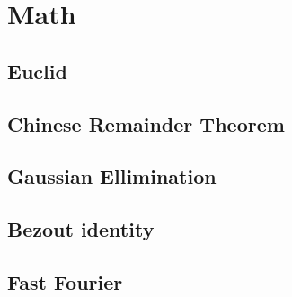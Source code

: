 \section{Math}

\subsection{Euclid}
 

\subsection{Chinese Remainder Theorem}
\subsection{Gaussian Ellimination}
\subsection{Bezout identity}
\subsection{Fast Fourier}